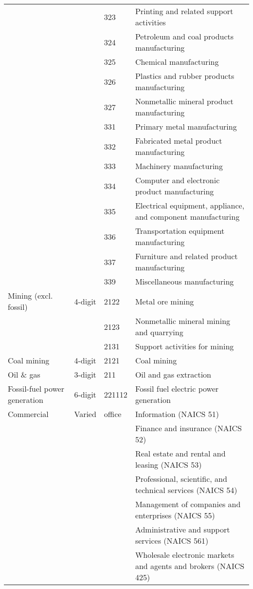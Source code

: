\begin{longtable}{l l l l}
         & & 323 & Printing and related support activities\\
         & & 324 & Petroleum and coal products manufacturing\\
         & & 325 & Chemical manufacturing\\
         & & 326 & Plastics and rubber products manufacturing\\
         & & 327 & Nonmetallic mineral product manufacturing\\
         & & 331 & Primary metal manufacturing\\
         & & 332 & Fabricated metal product manufacturing\\
         & & 333 & Machinery manufacturing\\
         & & 334 & Computer and electronic product manufacturing\\
         & & 335 & Electrical equipment, appliance, and component manufacturing\\
         & & 336 & Transportation equipment manufacturing\\
         & & 337 & Furniture and related product manufacturing\\
         & & 339 & Miscellaneous manufacturing\\
        Mining (excl. fossil) & 4-digit & 2122 & Metal ore mining\\
         & & 2123 & Nonmetallic mineral mining and quarrying\\
         & & 2131 & Support activities for mining\\
        Coal mining & 4-digit & 2121 & Coal mining\\
        Oil \& gas & 3-digit & 211 & Oil and gas extraction\\
        Fossil-fuel power generation & 6-digit & 221112 & Fossil fuel electric power generation\\
         Commercial & Varied & office & Information (NAICS 51) \\
        & &  & Finance and insurance (NAICS 52)\\
         & &  & Real estate and rental and leasing (NAICS 53)\\
         & &  & Professional, scientific, and technical services (NAICS 54)\\
         & &  & Management of companies and enterprises (NAICS 55)\\
        & &  & Administrative and support services (NAICS 561)\\ 
        & &  & Wholesale electronic markets and agents and brokers (NAICS 425)\\

\end{longtable}
